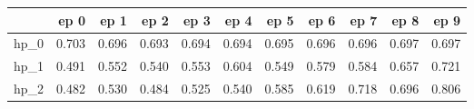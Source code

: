 \begin{tabular}{lrrrrrrrrrr}
\toprule
{} &   ep 0 &   ep 1 &   ep 2 &   ep 3 &   ep 4 &   ep 5 &   ep 6 &   ep 7 &   ep 8 &   ep 9 \\
\midrule
hp\_0 &  0.703 &  0.696 &  0.693 &  0.694 &  0.694 &  0.695 &  0.696 &  0.696 &  0.697 &  0.697 \\
hp\_1 &  0.491 &  0.552 &  0.540 &  0.553 &  0.604 &  0.549 &  0.579 &  0.584 &  0.657 &  0.721 \\
hp\_2 &  0.482 &  0.530 &  0.484 &  0.525 &  0.540 &  0.585 &  0.619 &  0.718 &  0.696 &  0.806 \\
\bottomrule
\end{tabular}
